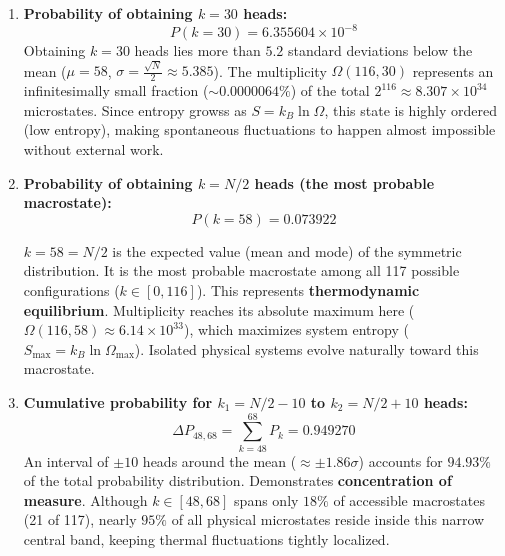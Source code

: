 \documentclass[11pt, a4paper]{article}
\begin{document}
\begin{enumerate}[label=\alph*)]
    \item \textbf{Probability of obtaining $k = 30$ heads:}
    \begin{equation} P(k = 30) = 6.355604 \times 10^{-8} \end{equation}
    Obtaining $k = 30$ heads lies more than $5.2$ standard deviations below the mean ($\mu = 58$, $\sigma = \frac{\sqrt{N}}{2} \approx 5.385$).
     The multiplicity $\Omega(116, 30)$ represents an infinitesimally small fraction ($\sim 0.0000064\%$) of the total $2^{116} \approx 8.307 \times 10^{34}$ microstates. Since entropy growss as $S = k_B \ln \Omega$, this state is highly ordered (low entropy), making spontaneous fluctuations to happen almost impossible without external work.
    

    \vspace{0.3cm}
    \item \textbf{Probability of obtaining $k = N/2$ heads (the most probable macrostate):}
    \begin{equation} P(k = 58) = 0.073922 \end{equation}
    
    $k = 58 = N/2$ is the expected value (mean and mode) of the symmetric distribution. It is the most probable macrostate among all 117 possible configurations ($k \in [0, 116]$).
    This represents \textbf{thermodynamic equilibrium}. Multiplicity reaches its absolute maximum here ($\Omega(116, 58) \approx 6.14 \times 10^{33}$), which maximizes system entropy ($S_{\text{max}} = k_B \ln \Omega_{\text{max}}$). Isolated physical systems evolve naturally toward this macrostate.
    

    \vspace{0.3cm}
    \item \textbf{Cumulative probability for $k_1 = N/2 - 10$ to $k_2 = N/2 + 10$ heads:}
    \begin{equation} \Delta P_{48, 68} = \sum_{k=48}^{68} P_k = 0.949270 \end{equation}
    An interval of $\pm 10$ heads around the mean ($\approx \pm 1.86\sigma$) accounts for $94.93\%$ of the total probability distribution.
    Demonstrates \textbf{concentration of measure}. Although $k \in [48, 68]$ spans only $18\%$ of accessible macrostates (21 of 117), nearly $95\%$ of all physical microstates reside inside this narrow central band, keeping thermal fluctuations tightly localized.
    


\end{enumerate}
\end{document}
